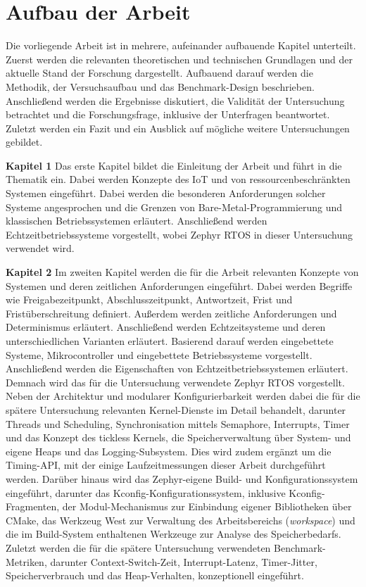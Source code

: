 \section{Aufbau der Arbeit}
Die vorliegende Arbeit ist in mehrere, aufeinander aufbauende Kapitel unterteilt. Zuerst werden die relevanten theoretischen und technischen Grundlagen und der aktuelle Stand der Forschung dargestellt. Aufbauend darauf werden die Methodik, der Versuchsaufbau und das Benchmark-Design beschrieben. Anschließend werden die Ergebnisse diskutiert, die Validität der Untersuchung betrachtet und die Forschungsfrage, inklusive der Unterfragen beantwortet. Zuletzt werden ein Fazit und ein Ausblick auf mögliche weitere Untersuchungen gebildet.

\textbf{Kapitel 1 }Das erste Kapitel bildet die Einleitung der Arbeit und führt in die Thematik ein. Dabei werden Konzepte des IoT und von ressourcenbeschränkten Systemen eingeführt. Dabei werden die besonderen Anforderungen solcher Systeme angesprochen und die Grenzen von Bare-Metal-Programmierung und klassischen Betriebssystemen erläutert. Anschließend werden Echtzeitbetriebssysteme vorgestellt, wobei Zephyr RTOS in dieser Untersuchung verwendet wird.

\textbf{Kapitel 2 }Im zweiten Kapitel werden die für die Arbeit relevanten Konzepte von Systemen und deren zeitlichen Anforderungen eingeführt. Dabei werden Begriffe wie Freigabezeitpunkt, Abschlusszeitpunkt, Antwortzeit, Frist und Fristüberschreitung definiert. Außerdem werden zeitliche Anforderungen und Determinismus erläutert. Anschließend werden Echtzeitsysteme und deren unterschiedlichen Varianten erläutert. Basierend darauf werden eingebettete Systeme, Mikrocontroller und eingebettete Betriebssysteme vorgestellt. Anschließend werden die Eigenschaften von Echtzeitbetriebssystemen erläutert. Demnach wird das für die Untersuchung verwendete Zephyr RTOS vorgestellt. Neben der Architektur und modularer Konfigurierbarkeit werden dabei die für die spätere Untersuchung relevanten Kernel-Dienste im Detail behandelt, darunter Threads und Scheduling, Synchronisation mittels Semaphore, Interrupts, Timer und das Konzept des tickless Kernels, die Speicherverwaltung über System- und eigene Heaps und das Logging-Subsystem. Dies wird zudem ergänzt um die Timing-API, mit der einige Laufzeitmessungen dieser Arbeit durchgeführt werden. Darüber hinaus wird das Zephyr-eigene Build- und Konfigurationssystem eingeführt, darunter das Kconfig-Konfigurationssystem, inklusive Kconfig-Fragmenten, der Modul-Mechanismus zur Einbindung eigener Bibliotheken über CMake, das Werkzeug West zur Verwaltung des Arbeitsbereichs (\emph{workspace}) und die im Build-System enthaltenen Werkzeuge zur Analyse des Speicherbedarfs. Zuletzt werden die für die spätere Untersuchung verwendeten Benchmark-Metriken, darunter Context-Switch-Zeit, Interrupt-Latenz, Timer-Jitter, Speicherverbrauch und das Heap-Verhalten, konzeptionell eingeführt.

